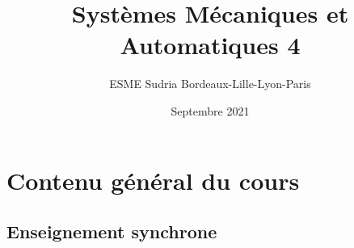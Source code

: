 \documentclass[a4paper,11pt]{article}
\title{Systèmes Mécaniques et Automatiques 4}
\date{Septembre 2021}
\author{ESME Sudria Bordeaux-Lille-Lyon-Paris}
\begin{document}
\maketitle
\section*{Contenu général du cours}

\subsection*{Enseignement synchrone}
\end{document}
